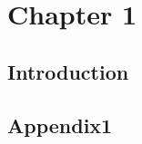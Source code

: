 \chapter[Chapter 1]{Chapter 1 \label{ch:chapter1}}

%
%
\begingroup
\let\thefootnote\relax{}
\endgroup
%
%

\section{Introduction}

\cite{dummy-citation}




\setcounter{section}{0}%
\renewcommand\thesection{\thechapter.\Alph{section}}

%
% 
\section{Appendix1}
\label{appendix:one}

\renewcommand\thesection{\thechapter.\arabic{section}}

